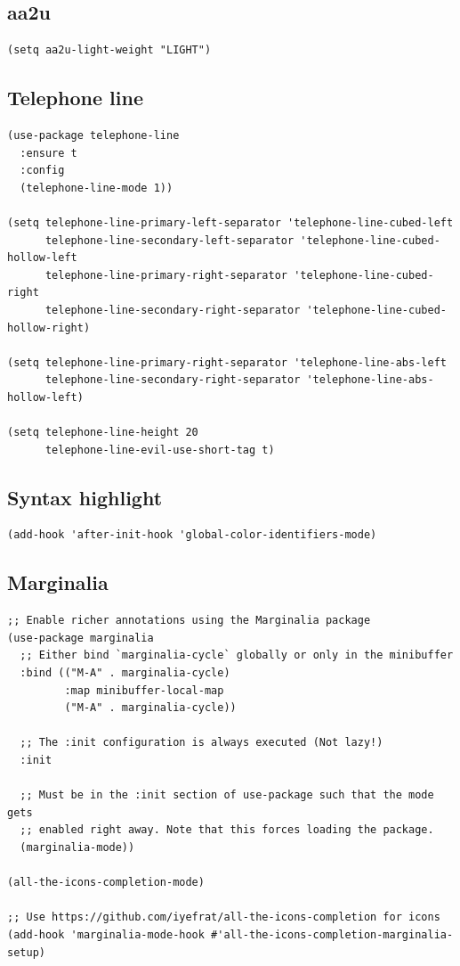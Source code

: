 \documentclass[10pt]{article}
\begin{document}
\subsection{aa2u}
\label{sec:org49c6698}
\begin{verbatim}
(setq aa2u-light-weight "LIGHT")
\end{verbatim}
\subsection{Telephone line}
\label{sec:orgc7b9d6d}
\begin{verbatim}
(use-package telephone-line
  :ensure t
  :config
  (telephone-line-mode 1))

(setq telephone-line-primary-left-separator 'telephone-line-cubed-left
      telephone-line-secondary-left-separator 'telephone-line-cubed-hollow-left
      telephone-line-primary-right-separator 'telephone-line-cubed-right
      telephone-line-secondary-right-separator 'telephone-line-cubed-hollow-right)

(setq telephone-line-primary-right-separator 'telephone-line-abs-left
      telephone-line-secondary-right-separator 'telephone-line-abs-hollow-left)

(setq telephone-line-height 20
      telephone-line-evil-use-short-tag t)
\end{verbatim}
\subsection{Syntax highlight}
\label{sec:org98f6ebf}
\begin{verbatim}
(add-hook 'after-init-hook 'global-color-identifiers-mode)
\end{verbatim}
\subsection{Marginalia}
\label{sec:orgfd6826e}
\begin{verbatim}
;; Enable richer annotations using the Marginalia package
(use-package marginalia
  ;; Either bind `marginalia-cycle` globally or only in the minibuffer
  :bind (("M-A" . marginalia-cycle)
         :map minibuffer-local-map
         ("M-A" . marginalia-cycle))

  ;; The :init configuration is always executed (Not lazy!)
  :init

  ;; Must be in the :init section of use-package such that the mode gets
  ;; enabled right away. Note that this forces loading the package.
  (marginalia-mode))

(all-the-icons-completion-mode)

;; Use https://github.com/iyefrat/all-the-icons-completion for icons
(add-hook 'marginalia-mode-hook #'all-the-icons-completion-marginalia-setup)
\end{verbatim}
\end{document}
